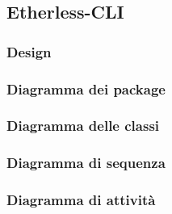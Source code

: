 \subsection{Etherless-CLI}
\subsubsection{Design}
\subsubsection{Diagramma dei package}
\subsubsection{Diagramma delle classi}
\subsubsection{Diagramma di sequenza}
\subsubsection{Diagramma di attività}

